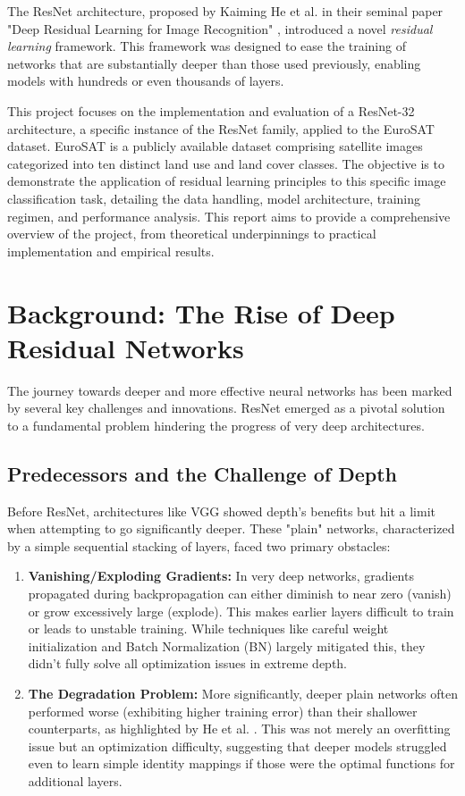\documentclass[11pt, a4paper]{article}
\begin{document}
The ResNet architecture, proposed by Kaiming He et al. in their seminal paper "Deep Residual Learning for Image Recognition" \cite{he2015deepresiduallearningimage}, introduced a novel \textit{residual learning} framework. This framework was designed to ease the training of networks that are substantially deeper than those used previously, enabling models with hundreds or even thousands of layers.

This project focuses on the implementation and evaluation of a ResNet-32 architecture, a specific instance of the ResNet family, applied to the EuroSAT dataset. EuroSAT \cite{EuroSATDB} is a publicly available dataset comprising satellite images categorized into ten distinct land use and land cover classes. The objective is to demonstrate the application of residual learning principles to this specific image classification task, detailing the data handling, model architecture, training regimen, and performance analysis. This report aims to provide a comprehensive overview of the project, from theoretical underpinnings to practical implementation and empirical results.

\clearpage %
\section{Background: The Rise of Deep Residual Networks}
The journey towards deeper and more effective neural networks has been marked by several key challenges and innovations. ResNet emerged as a pivotal solution to a fundamental problem hindering the progress of very deep architectures.

\subsection{Predecessors and the Challenge of Depth}
Before ResNet, architectures like VGG \cite{Simonyan15} showed depth's benefits but hit a limit when attempting to go significantly deeper. These "plain" networks, characterized by a simple sequential stacking of layers, faced two primary obstacles:
\begin{enumerate}[label=\arabic*), itemsep=0.5em] %
    \item \textbf{Vanishing/Exploding Gradients:} In very deep networks, gradients propagated during backpropagation can either diminish to near zero (vanish) or grow excessively large (explode). This makes earlier layers difficult to train or leads to unstable training. While techniques like careful weight initialization and Batch Normalization (BN) \cite{Ioffe2015BN} largely mitigated this, they didn't fully solve all optimization issues in extreme depth.
    \item \textbf{The Degradation Problem:} More significantly, deeper plain networks often performed worse (exhibiting higher training error) than their shallower counterparts, as highlighted by He et al. \cite{he2015deepresiduallearningimage}. This was not merely an overfitting issue but an optimization difficulty, suggesting that deeper models struggled even to learn simple identity mappings if those were the optimal functions for additional layers.
\end{enumerate}
\end{document}
